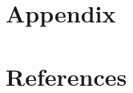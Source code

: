 \documentclass[12pt]{article}
\begin{document}
\section*{Appendix}
\label{sec:appx}

\section*{References}
\label{sec:refs}
\end{document}

